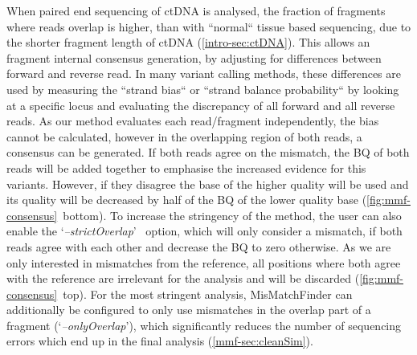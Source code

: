 When paired end sequencing of ctDNA is analysed, the fraction of fragments where reads overlap is higher, than with ``normal`` tissue based sequencing, due to the shorter fragment length of ctDNA (\autoref{intro-sec:ctDNA}). This allows an fragment internal consensus generation, by adjusting for differences between forward and reverse read. In many variant calling methods, these differences are used by measuring the ``strand bias`` \cite{Guo2012, Saunders2012, GATKTeam2019} or ``strand balance probability`` \cite{Garrison2012} by looking at a specific locus and evaluating the discrepancy of all forward and all reverse reads. As our method evaluates each read/fragment independently, the bias cannot be calculated, however in the overlapping region of both reads, a consensus can be generated. If both reads agree on the mismatch, the BQ of both reads will be added together to emphasise the increased evidence for this variants. However, if they disagree the base of the higher quality will be used and its quality will be decreased by half of the BQ of the lower quality base (\autoref{fig:mmf-consensus}~bottom). To increase the stringency of the method, the user can also enable the \lq\emph{--strictOverlap}\rq~ option, which will only consider a mismatch, if both reads agree with each other and decrease the BQ to zero otherwise. As we are only interested in mismatches from the reference, all positions where both agree with the reference are irrelevant for the analysis and will be discarded (\autoref{fig:mmf-consensus}~top). For the most stringent analysis, MisMatchFinder can additionally be configured to only use mismatches in the overlap part of a fragment (\lq\emph{--onlyOverlap}\rq), which significantly reduces the number of sequencing errors which end up in the final analysis (\autoref{mmf-sec:cleanSim}).

